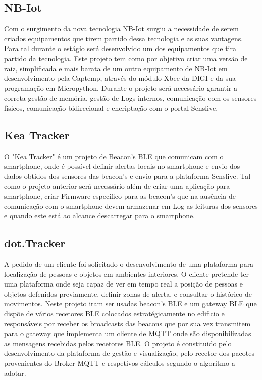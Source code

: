 \subsection{NB-Iot}
Com o surgimento da nova tecnologia NB-Iot surgiu a necessidade de serem criados equipamentos que tirem partido dessa tecnologia e as suas vantagens. Para tal durante o estágio será desenvolvido um dos equipamentos que tira partido da tecnologia. Este projeto tem como por objetivo criar uma versão de raiz, simplificada e mais barata de um outro equipamento de NB-Iot em desenvolvimento pela Captemp, através do módulo Xbee da DIGI e da sua programação em Micropython. Durante o projeto será necessário garantir a correta gestão de memória, gestão de Logs internos, comunicação com os sensores físicos, comunicação bidirecional e encriptação com o portal Senslive.
\subsection{Kea Tracker}
O "Kea Tracker" é um projeto de Beacon’s BLE que comunicam com o smartphone, onde é possível definir alertas locais no smartphone e envio dos dados obtidos dos sensores das beacon’s e envio para a plataforma Senslive.
Tal como o projeto anterior será necessário além de criar uma aplicação para smartphone, criar Firmware específico para as beacon’s que na ausência de comunicação com o smartphone devem armazenar em Log as leituras dos sensores e quando este está ao alcance descarregar para o smartphone.
\subsection{dot.Tracker}
A pedido de um cliente foi solicitado o desenvolvimento de uma plataforma para localização de pessoas e objetos em ambientes interiores. O cliente pretende ter uma plataforma onde seja capaz de ver em tempo real a posição de pessoas e objetos defenidos previamente, definir zonas de alerta, e consultar o histórico de movimentos. Neste projeto iram ser usadas beacon's BLE e um gateway BLE que dispõe de vários recetores BLE colocados estratégicamente no edificio e responsáveis por receber os broadcasts das beacons que por sua vez transmitem para o gateway que implementa um cliente de MQTT onde são disponibilizadas as mensagens recebidas pelos recetores BLE. O projeto é constituido pelo desenvolvimento da plataforma de gestão e visualização, pelo recetor dos pacotes provenientes do Broker MQTT e respetivos cálculos segundo o algoritmo a adotar.

